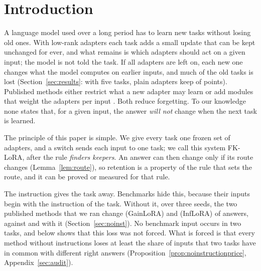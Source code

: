 \section{Introduction}
\label{sec:intro}

A language model used over a long period has to learn new tasks without losing old ones. With
low-rank adapters \citep{hu2022lora} each task adds a small update that can be kept unchanged for
ever, and what remains is which adapters should act on a given input; the model is not told the
task. If all adapters are left on, each new one changes what the model computes on earlier inputs,
and much of the old tasks is lost (Section~\ref{sec:results}: with five tasks, plain
adapters keep \FivePlainAP{} of \FivePlainLearned{} points). Published methods either restrict what a
new adapter may learn \citep{wang2023olora,liang2024inflora,spacelora2026} or add modules that weight
the adapters per input \citep{liang2025gainlora,zhao2024sapt,latentlora2026}. Both reduce forgetting.
To our knowledge none states that, for a given input, the answer \emph{will not} change when the
next task is learned.

The principle of this paper is simple. We give every task one frozen set of adapters, and a switch
sends each input to one task; we call this system FK-LoRA, after the rule \emph{finders keepers}. An answer can then change only if its route changes
(Lemma~\ref{lem:route}), so retention is a property of the rule that sets the route, and it can be
proved or measured for that rule.

The instruction gives the task away. Benchmarks hide this, because their inputs begin with the
instruction of the task. Without it, over three seeds, the two published methods that we ran change
\AudSeedsGainloraChanged{} (GainLoRA) and \AudSeedsInfloraChanged{} (InfLoRA) of \AudSeedsCompared{}
answers, against \FiveGainChanged{} and \FiveInfChanged{} with it (Section~\ref{sec:noinst}). No
benchmark input occurs in two tasks, and \recog{} below shows that this loss was not forced. What is forced is that every method
without instructions loses at least the share of inputs that two tasks have in common with
different right answers (Proposition~\ref{prop:noinstructionprice}, Appendix~\ref{sec:audit}).

